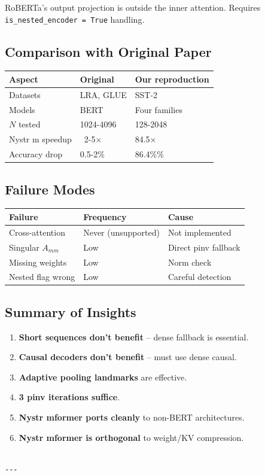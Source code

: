 RoBERTa's output projection is outside the inner attention. Requires 
\texttt{is\_nested\_encoder = True} handling.

\subsection{Comparison with Original Paper}

\begin{table}[H]
\centering
\small
\begin{tabular}{lll}
\toprule
\textbf{Aspect} & \textbf{Original} & \textbf{Our reproduction} \\
\midrule
Datasets & LRA, GLUE & SST-2 \\
Models & BERT & Four families \\
$N$ tested & 1024-4096 & 128-2048 \\
Nystr m speedup & ~2-5$\times$ & 84.5$\times$ \\
Accuracy drop & 0.5-2\% & 86.4\%\% \\
\bottomrule
\end{tabular}
\end{table}

\subsection{Failure Modes}

\begin{table}[H]
\centering
\small
\begin{tabular}{lll}
\toprule
\textbf{Failure} & \textbf{Frequency} & \textbf{Cause} \\
\midrule
Cross-attention & Never (unsupported) & Not implemented \\
Singular $A_{mm}$ & Low & Direct pinv fallback \\
Missing weights & Low & Norm check \\
Nested flag wrong & Low & Careful detection \\
\bottomrule
\end{tabular}
\end{table}

\subsection{Summary of Insights}

\begin{enumerate}
\item \textbf{Short sequences don't benefit} -- dense fallback is essential.
\item \textbf{Causal decoders don't benefit} -- must use dense causal.
\item \textbf{Adaptive pooling landmarks} are effective.
\item \textbf{3 pinv iterations suffice}.
\item \textbf{Nystr mformer ports cleanly} to non-BERT architectures.
\item \textbf{Nystr mformer is orthogonal} to weight/KV compression.
\end{enumerate}
\begin{lstlisting}

---
\end{lstlisting}